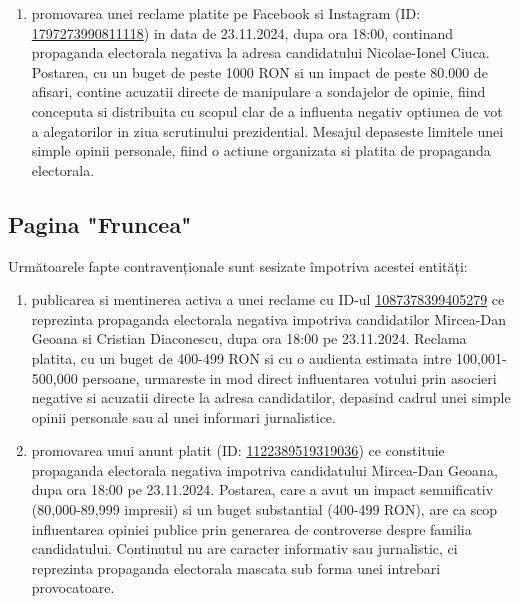 \documentclass[a4paper,12pt]{article}
\begin{document}
\begin{enumerate}[leftmargin=*, label=\arabic*.)]
    \item promovarea unei reclame platite pe Facebook si Instagram (ID: \href{https://www.facebook.com/ads/library/?id=1797273990811118}{1797273990811118}) in data de 23.11.2024, dupa ora 18:00, continand propaganda electorala negativa la adresa candidatului Nicolae-Ionel Ciuca. Postarea, cu un buget de peste 1000 RON si un impact de peste 80.000 de afisari, contine acuzatii directe de manipulare a sondajelor de opinie, fiind conceputa si distribuita cu scopul clar de a influenta negativ optiunea de vot a alegatorilor in ziua scrutinului prezidential. Mesajul depaseste limitele unei simple opinii personale, fiind o actiune organizata si platita de propaganda electorala.
\end{enumerate}

\vspace{0.5cm}

\subsection{Pagina "Fruncea"}
Următoarele fapte contravenționale sunt sesizate împotriva acestei entități:

\begin{enumerate}[leftmargin=*, label=\arabic*.)]
    \item publicarea si mentinerea activa a unei reclame cu ID-ul \href{https://www.facebook.com/ads/library/?id=1087378399405279}{1087378399405279} ce reprezinta propaganda electorala negativa impotriva candidatilor Mircea-Dan Geoana si Cristian Diaconescu, dupa ora 18:00 pe 23.11.2024. Reclama platita, cu un buget de 400-499 RON si cu o audienta estimata intre 100,001-500,000 persoane, urmareste in mod direct influentarea votului prin asocieri negative si acuzatii directe la adresa candidatilor, depasind cadrul unei simple opinii personale sau al unei informari jurnalistice.
    \item promovarea unui anunt platit (ID: \href{https://www.facebook.com/ads/library/?id=1122389519319036}{1122389519319036}) ce constituie propaganda electorala negativa impotriva candidatului Mircea-Dan Geoana, dupa ora 18:00 pe 23.11.2024. Postarea, care a avut un impact semnificativ (80,000-89,999 impresii) si un buget substantial (400-499 RON), are ca scop influentarea opiniei publice prin generarea de controverse despre familia candidatului. Continutul nu are caracter informativ sau jurnalistic, ci reprezinta propaganda electorala mascata sub forma unei intrebari provocatoare.
\end{enumerate}
\end{document}
